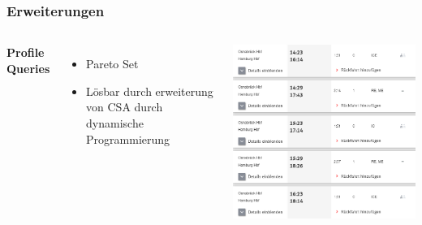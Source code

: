 \documentclass[aspectratio=169]{beamer}
\begin{document}
\begin{frame}
\frametitle{Erweiterungen}
\begin{columns}[c] %
	
	\textbf{Profile Queries}
	\begin{itemize}
		\item Pareto Set
		\item Lösbar durch erweiterung von CSA durch dynamische Programmierung
	\end{itemize}
	\includegraphics[scale=0.3]{profiles.png}
	
\end{columns}
\end{frame}

\end{document}

